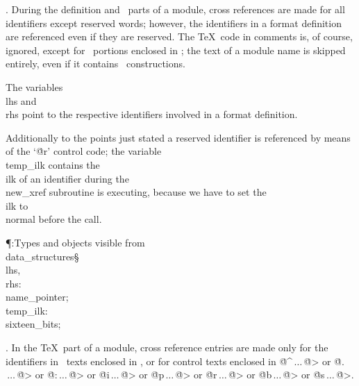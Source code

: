 . During the definition and \ADA\ parts of a module, cross references
are made for all identifiers except reserved words; however, the
identifiers in a format definition are referenced even if they are
reserved. The \TeX\ code in comments is, of course, ignored, except for
\ADA\ portions enclosed in \ab; the text of a module name is skipped
entirely, even if it contains \ab\ constructions.

The variables \\{lhs} and \\{rhs} point to the respective identifiers involved
in a format definition.

Additionally to the points just stated a reserved identifier is
referenced by means of the `\.{@r}' control code; the variable
\\{temp\_ilk} contains the \\{ilk} of an identifier during the \\{new\_xref}
subroutine is executing, because we have to set the \\{ilk} to
\\{normal} before the call.

\Y\P\?\4:Types and objects visible from \\{data\_structures}\X\mathrel{+}\S%
\?\6
\\{lhs}\?,\?\\{rhs}\?:\?\\{name\_pointer};\6
\\{temp\_ilk}\?:\?\\{sixteen\_bits};\par
\fi

. In the \TeX\ part of a module, cross reference entries are made only for
the identifiers in \ADA\ texts enclosed in \ab, or for control texts
enclosed in \.{@\^}$\,\ldots\,$\.{@>} or \.{@.}$\,\ldots\,$\.{@>}
or \.{@:}$\,\ldots\,$\.{@>}
or \.{@i}$\,\ldots\,$\.{@>}
or \.{@p}$\,\ldots\,$\.{@>}
or \.{@r}$\,\ldots\,$\.{@>}
or \.{@b}$\,\ldots\,$\.{@>}
or \.{@s}$\,\ldots\,$\.{@>}.



